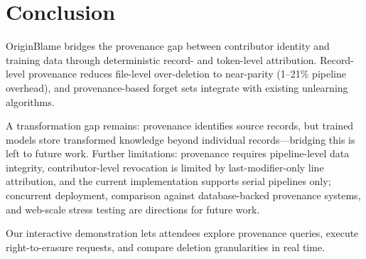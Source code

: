 \section{Conclusion}

OriginBlame bridges the provenance gap between contributor identity and training data through deterministic record- and token-level attribution. Record-level provenance reduces file-level over-deletion to near-parity (1--21\% pipeline overhead), and provenance-based forget sets integrate with existing unlearning algorithms.

A transformation gap remains: provenance identifies source records, but trained models store transformed knowledge beyond individual records---bridging this is left to future work. Further limitations: provenance requires pipeline-level data integrity, contributor-level revocation is limited by last-modifier-only line attribution, and the current implementation supports serial pipelines only; concurrent deployment, comparison against database-backed provenance systems, and web-scale stress testing are directions for future work.

Our interactive demonstration lets attendees explore provenance queries, execute right-to-erasure requests, and compare deletion granularities in real time.
